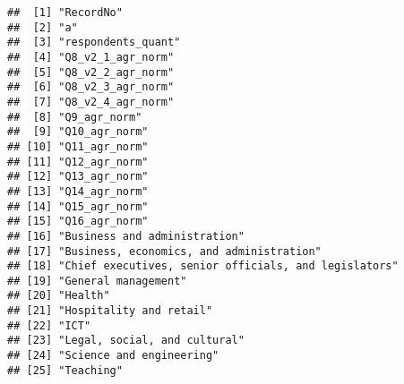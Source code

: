 \documentclass[]{article}
\newenvironment{Shaded}{\begin{snugshade}}{\end{snugshade}}
\newcommand{\KeywordTok}[1]{\textcolor[rgb]{0.13,0.29,0.53}{\textbf{{#1}}}}
\newcommand{\DecValTok}[1]{\textcolor[rgb]{0.00,0.00,0.81}{{#1}}}
\newcommand{\StringTok}[1]{\textcolor[rgb]{0.31,0.60,0.02}{{#1}}}
\newcommand{\CommentTok}[1]{\textcolor[rgb]{0.56,0.35,0.01}{\textit{{#1}}}}
\newcommand{\NormalTok}[1]{{#1}}
\begin{document}
\begin{verbatim}
##  [1] "RecordNo"                                           
##  [2] "a"                                                  
##  [3] "respondents_quant"                                  
##  [4] "Q8_v2_1_agr_norm"                                   
##  [5] "Q8_v2_2_agr_norm"                                   
##  [6] "Q8_v2_3_agr_norm"                                   
##  [7] "Q8_v2_4_agr_norm"                                   
##  [8] "Q9_agr_norm"                                        
##  [9] "Q10_agr_norm"                                       
## [10] "Q11_agr_norm"                                       
## [11] "Q12_agr_norm"                                       
## [12] "Q13_agr_norm"                                       
## [13] "Q14_agr_norm"                                       
## [14] "Q15_agr_norm"                                       
## [15] "Q16_agr_norm"                                       
## [16] "Business and administration"                        
## [17] "Business, economics, and administration"            
## [18] "Chief executives, senior officials, and legislators"
## [19] "General management"                                 
## [20] "Health"                                             
## [21] "Hospitality and retail"                             
## [22] "ICT"                                                
## [23] "Legal, social, and cultural"                        
## [24] "Science and engineering"                            
## [25] "Teaching"
\end{verbatim}

\begin{Shaded}
\end{Shaded}
\end{document}
